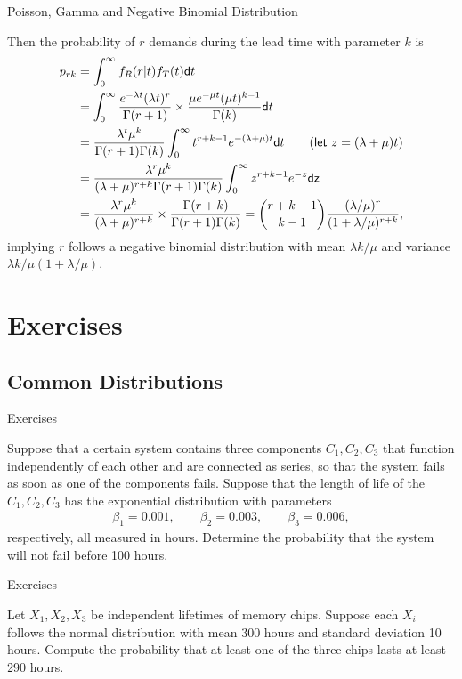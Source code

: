 \begin{frame}{Poisson, Gamma and Negative Binomial Distribution}

\justifying
{} Then the probability of $r$ demands during the lead time with parameter $k$ is
\begin{align*}
p_{rk} & = \int_0^{\infty} f_R(r|t) f_T(t) \mathsf{d}t \\
& = \int_0^{\infty} \frac{e^{-\lambda t}(\lambda t)^r}{\Gamma(r+1)} \times \frac{\mu e^{-\mu t}(\mu t)^{k-1}}{\Gamma(k)} \mathsf{d}t \\
& = \frac{\lambda^t \mu^k}{\Gamma(r+1)\Gamma(k)}\int_0^{\infty} t^{r+k-1}e^{-(\lambda+\mu)t}\mathsf{d}t \qquad (\mathsf{let\ }z = (\lambda + \mu)t) \\
& = \frac{\lambda^r\mu^k}{(\lambda+\mu)^{r+k}\Gamma(r+1)\Gamma(k)}\int_0^{\infty} z^{r+k-1}e^{-z}\mathsf{dz} \\
& = \frac{\lambda^r\mu^k}{(\lambda+\mu)^{r+k}}\times \frac{\Gamma(r+k)}{\Gamma(r+1)\Gamma(k)} = \binom{r+k-1}{k-1}\frac{(\lambda/\mu)^r}{(1+\lambda/\mu)^{r+k}},
\end{align*}
implying $r$ follows a negative binomial distribution with mean $\lambda k/\mu$ and variance $\lambda k/\mu(1+\lambda/\mu)$.


\end{frame}


\section{Exercises}

\subsection{Common Distributions}

\begin{frame}{Exercises}

\justifying
{} Suppose that a certain system contains three components $C_1, C_2, C_3$ that function independently of each other and are connected as series, so that the system fails as soon as one of the components fails. Suppose that the length of life of the $C_1, C_2, C_3$ has the exponential distribution with parameters
\begin{align*}
\beta_1 = 0.001, \qquad \beta_2 = 0.003, \qquad \beta_3 = 0.006,
\end{align*}
respectively, all measured in hours. Determine the probability that the system will not fail before 100 hours.

\end{frame}


\begin{frame}{Exercises}

\justifying
{} Let $X_1, X_2, X_3$ be independent lifetimes of memory chips. Suppose each $X_i$ follows the normal distribution with mean 300 hours and standard deviation 10 hours. Compute the probability that at least one of the three chips lasts at least 290 hours.

\end{frame}
